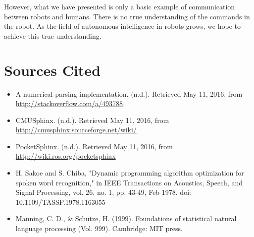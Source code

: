 \documentclass{article}
\begin{document}
\vspace{5mm}

\noindent However, what we have presented is only a basic example of communication between robots and humans. There is no true understanding of the commands in the robot. As the field of autonomous intelligence in robots grows, we hope to achieve this true understanding.

\section{Sources Cited}
\begin{itemize}
    \item A numerical parsing implementation. (n.d.). Retrieved May 11, 2016, from \url{http://stackoverflow.com/a/493788}.
    \item CMUSphinx. (n.d.). Retrieved May 11, 2016, from \url{http://cmusphinx.sourceforge.net/wiki/} 
    \item PocketSphinx. (n.d.). Retrieved May 11, 2016, from \url{http://wiki.ros.org/pocketsphinx}
    \item H. Sakoe and S. Chiba, "Dynamic programming algorithm optimization for spoken word recognition," in IEEE Transactions on Acoustics, Speech, and Signal Processing, vol. 26, no. 1, pp. 43-49, Feb 1978.
doi: 10.1109/TASSP.1978.1163055
    \item Manning, C. D., \& Sch\"{u}tze, H. (1999). Foundations of statistical natural language processing (Vol. 999). Cambridge: MIT press.
\end{itemize}
\end{document}
